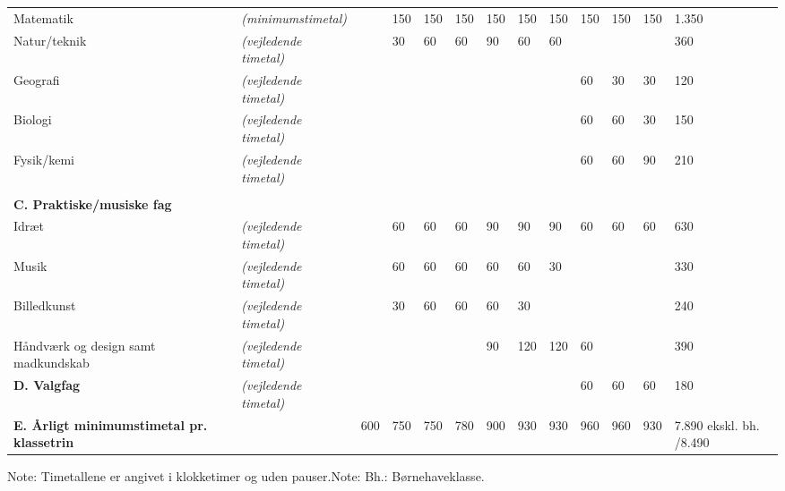 \begin{table}[]
{\begin{tabular}{lllllllllllll}
			Matematik                                                  & \textit{(minimumstimetal)}    &     & 150 & 150 & 150 & 150 & 150 & 150 & 150 & 150 & 150 & 1.350                   \\
			Natur/teknik                                               & \textit{(vejledende timetal)} &     & 30  & 60  & 60  & 90  & 60  & 60  &     &     &     & 360                     \\
			Geografi                                                   & \textit{(vejledende timetal)} &     &     &     &     &     &     &     & 60  & 30  & 30  & 120                     \\
			Biologi                                                    & \textit{(vejledende timetal)} &     &     &     &     &     &     &     & 60  & 60  & 30  & 150                     \\
			Fysik/kemi                                                 & \textit{(vejledende timetal)} &     &     &     &     &     &     &     & 60  & 60  & 90  & 210                     \\
			&                               &     &     &     &     &     &     &     &     &     &     &                         \\
			\textbf{C. Praktiske/musiske fag}                          &                               &     &     &     &     &     &     &     &     &     &     &                         \\
			Idræt                                                      & \textit{(vejledende timetal)} &     & 60  & 60  & 60  & 90  & 90  & 90  & 60  & 60  & 60  & 630                     \\
			Musik                                                      & \textit{(vejledende timetal)} &     & 60  & 60  & 60  & 60  & 60  & 30  &     &     &     & 330                     \\
			Billedkunst                                                & \textit{(vejledende timetal)} &     & 30  & 60  & 60  & 60  & 30  &     &     &     &     & 240                     \\
			Håndværk og design samt madkundskab                        & \textit{(vejledende timetal)} &     &     &     &     & 90  & 120 & 120 & 60  &     &     & 390                     \\
			\textbf{D. Valgfag}                                        & \textit{(vejledende timetal)} &     &     &     &     &     &     &     & 60  & 60  & 60  & 180                     \\
			\textbf{E. Årligt minimumstimetal pr. klassetrin}          &                               & 600 & 750 & 750 & 780 & 900 & 930 & 930 & 960 & 960 & 930 & 7.890 ekskl. bh. /8.490
		\end{tabular}
	}
\end{table}
Note: Timetallene er angivet i klokketimer og uden pauser.Note: Bh.: Børnehaveklasse.